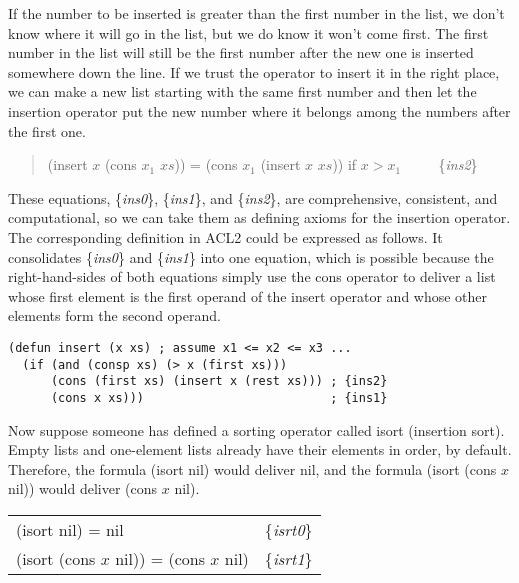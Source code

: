 If the number to be inserted is greater than the first number
in the list, we don't know where it will go in the list,
but we do know it won't come first.
The first number in the list will still be the first number
after the new one is inserted somewhere down the line.
If we trust the operator to insert it in the right place,
we can make a new list starting with the same first number
and then  let the insertion operator put the new number
where it belongs among the numbers after the first one.

\begin{quote}
(insert $x$ (cons $x_1$ $xs$)) = (cons $x_1$ (insert $x$ $xs$)) if $x > x_1$ ~~~~ \{\emph{ins2}\}
\end{quote}

These equations, \{\emph{ins0}\}, \{\emph{ins1}\}, and \{\emph{ins2}\},
are comprehensive, consistent, and computational,
so we can take them as defining axioms for the insertion operator.
The corresponding definition in ACL2 could be expressed as follows.
It consolidates \{\emph{ins0}\} and \{\emph{ins1}\} into one equation,
which is possible because the right-hand-sides of both equations
simply use the cons operator to deliver a list whose first element
is the first operand of the insert operator and whose other elements
form the second operand.

\label{defun:insert-isort}
\begin{Verbatim}
(defun insert (x xs) ; assume x1 <= x2 <= x3 ...
  (if (and (consp xs) (> x (first xs)))
      (cons (first xs) (insert x (rest xs))) ; {ins2}
      (cons x xs)))                          ; {ins1}
\end{Verbatim}

Now suppose someone has defined a sorting operator called isort
(insertion sort).
Empty lists and one-element lists already have their
elements in order, by default.
Therefore, the formula (isort nil) would deliver nil,
and the formula (isort (cons $x$ nil)) would deliver
(cons $x$ nil).

\begin{center}
\label{eq:isrt0}\label{eq:isrt1}
\begin{tabular}{ll}
(isort nil) = nil                       & \{\emph{isrt0}\} \\
(isort (cons $x$ nil)) = (cons $x$ nil) & \{\emph{isrt1}\} \\
\end{tabular}
\end{center}


